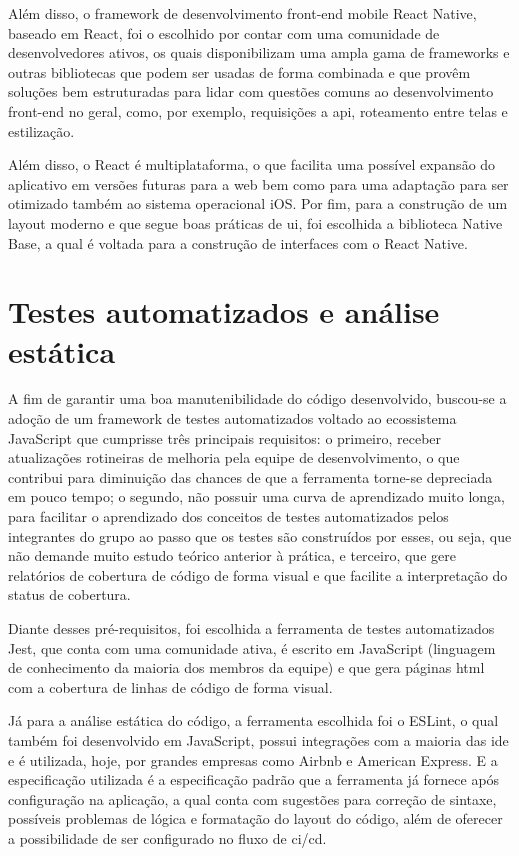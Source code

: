 Além disso, o framework de desenvolvimento front-end mobile React Native, baseado em React, foi o escolhido por contar com uma comunidade de desenvolvedores ativos, os quais disponibilizam uma ampla gama de frameworks e outras bibliotecas que podem ser usadas de forma combinada e que provêm soluções bem estruturadas para lidar com questões comuns ao desenvolvimento front-end no geral, como, por exemplo, requisições a \ac{api}, roteamento entre telas e estilização.

Além disso, o React é multiplataforma, o que facilita uma possível expansão do aplicativo em versões futuras para a web bem como para uma adaptação para ser otimizado também ao sistema operacional iOS.
Por fim, para a construção de um layout moderno e que segue boas práticas de \ac{ui}, foi escolhida a biblioteca Native Base, a qual é voltada para a construção de interfaces com o React Native.

\section{Testes automatizados e análise estática}
A fim de garantir uma boa manutenibilidade do código desenvolvido, buscou-se a adoção de um framework de testes automatizados voltado ao ecossistema JavaScript que cumprisse três principais requisitos: o primeiro, receber atualizações rotineiras de melhoria pela equipe de desenvolvimento, o que contribui para  diminuição das chances de que a ferramenta torne-se depreciada em pouco tempo; o segundo, não possuir uma curva de aprendizado muito longa, para facilitar o aprendizado dos conceitos de testes automatizados pelos integrantes do grupo ao passo que os testes são construídos por esses, ou seja, que não demande muito estudo teórico anterior à prática, e terceiro, que gere relatórios de cobertura de código de forma visual e que facilite a interpretação do status de cobertura. 

Diante desses pré-requisitos, foi escolhida a ferramenta de testes automatizados Jest, que conta com uma comunidade ativa, é escrito em JavaScript (linguagem de conhecimento da maioria dos membros da equipe) e que gera páginas \ac{html} com a cobertura de linhas de código de forma visual. 

Já para a análise estática do código, a ferramenta escolhida foi o ESLint, o qual também foi desenvolvido em JavaScript, possui integrações com a maioria das \ac{ide} e é utilizada, hoje, por grandes empresas como Airbnb e American Express. E a especificação utilizada é a especificação padrão que a ferramenta já fornece após configuração na aplicação, a qual conta com sugestões para correção de sintaxe, possíveis problemas de lógica e formatação do layout do código, além de oferecer a possibilidade de ser configurado no fluxo de \ac{ci}/\ac{cd}. 


